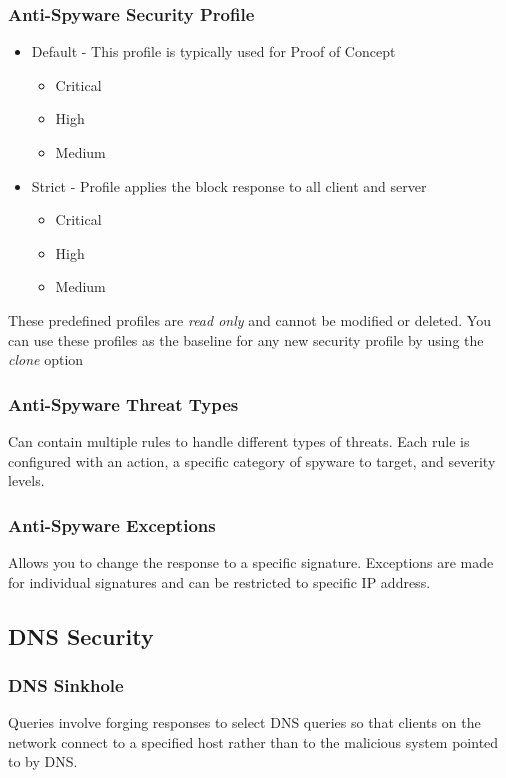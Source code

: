 \subsubsection{Anti-Spyware Security Profile}
	\begin{itemize}
		\item Default  - This profile is typically used for Proof of Concept
			\begin{itemize}
				\item Critical
				\item High
				\item Medium
			\end{itemize}	
		\item Strict - Profile applies the block response to all client and server
			\begin{itemize}
				\item Critical
				\item High
				\item Medium
			\end{itemize}		
	\end{itemize}		
These predefined profiles are \textit{read only} and cannot be modified or deleted. You can use these profiles as the baseline for any new security profile by using the \textit{clone} option

\subsubsection{Anti-Spyware Threat Types}
Can contain multiple rules to handle different types of threats. Each rule is configured with an action, a specific category of spyware to target, and severity levels.
\subsubsection{Anti-Spyware Exceptions}
Allows you to change the response to a specific signature.
Exceptions are made for individual signatures and can be restricted to specific IP address. 

\subsection{DNS Security}
\subsubsection{DNS Sinkhole}
Queries involve forging responses to select DNS queries so that clients on the network connect to a specified host rather than to the malicious system pointed to by DNS.

